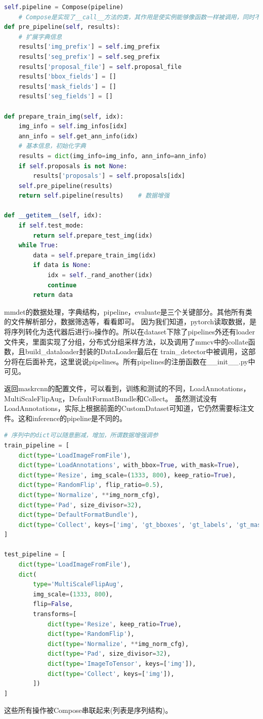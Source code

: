 \documentclass[UTF8]{ctexart}
\begin{document}
\lstset{style=mystyle}
\begin{lstlisting}[language=Python]
	self.pipeline = Compose(pipeline)   
	# Compose是实现了__call__方法的类，其作用是使实例能够像函数一样被调用，同时不影响实例本身的生命周期
def pre_pipeline(self, results):
	# 扩展字典信息
	results['img_prefix'] = self.img_prefix
	results['seg_prefix'] = self.seg_prefix
	results['proposal_file'] = self.proposal_file
	results['bbox_fields'] = []
	results['mask_fields'] = []
	results['seg_fields'] = []

def prepare_train_img(self, idx):
	img_info = self.img_infos[idx]
	ann_info = self.get_ann_info(idx)
	# 基本信息，初始化字典
	results = dict(img_info=img_info, ann_info=ann_info)
	if self.proposals is not None:
		results['proposals'] = self.proposals[idx]
	self.pre_pipeline(results)
	return self.pipeline(results)    # 数据增强

def __getitem__(self, idx):
	if self.test_mode:
		return self.prepare_test_img(idx)
	while True:
		data = self.prepare_train_img(idx)
		if data is None:
			idx = self._rand_another(idx)
			continue
		return data
\end{lstlisting}

mmdet的数据处理，字典结构，pipeline，evaluate是三个关键部分。其他所有类的文件解析部分，数据筛选等，看看即可。
因为我们知道，pytorch读取数据，是将序列转化为迭代器后进行io操作的。所以在dataset下除了pipelines外还有loader
文件夹，里面实现了分组，分布式分组采样方法，以及调用了mmcv中的collate函数，且build\_dataloader封装的DataLoader最后在
train\_detector中被调用，这部分将在后面补充，这里说说pipelines。所有pipelines的注册函数在\_\_init\_\_.py中可见。

返回maskrcnn的配置文件，可以看到，训练和测试的不同，LoadAnnotations，MultiScaleFlipAug，DefaultFormatBundle和Collect。
虽然测试没有LoadAnnotations，实际上根据前面的CustomDataset可知道，它仍然需要标注文件。这和inference的pipeline是不同的。

\lstset{style=mystyle}
\begin{lstlisting}[language=Python]
# 序列中的dict可以随意删减，增加，所谓数据增强调参
train_pipeline = [
    dict(type='LoadImageFromFile'),
    dict(type='LoadAnnotations', with_bbox=True, with_mask=True),
    dict(type='Resize', img_scale=(1333, 800), keep_ratio=True),
    dict(type='RandomFlip', flip_ratio=0.5),
    dict(type='Normalize', **img_norm_cfg),
    dict(type='Pad', size_divisor=32),
    dict(type='DefaultFormatBundle'),
    dict(type='Collect', keys=['img', 'gt_bboxes', 'gt_labels', 'gt_masks']),
]

test_pipeline = [
    dict(type='LoadImageFromFile'),
    dict(
        type='MultiScaleFlipAug',
        img_scale=(1333, 800),
        flip=False,
        transforms=[
            dict(type='Resize', keep_ratio=True),
            dict(type='RandomFlip'),
            dict(type='Normalize', **img_norm_cfg),
            dict(type='Pad', size_divisor=32),
            dict(type='ImageToTensor', keys=['img']),
            dict(type='Collect', keys=['img']),
        ])
]
\end{lstlisting}
这些所有操作被Compose串联起来(列表是序列结构)。
\end{document}
